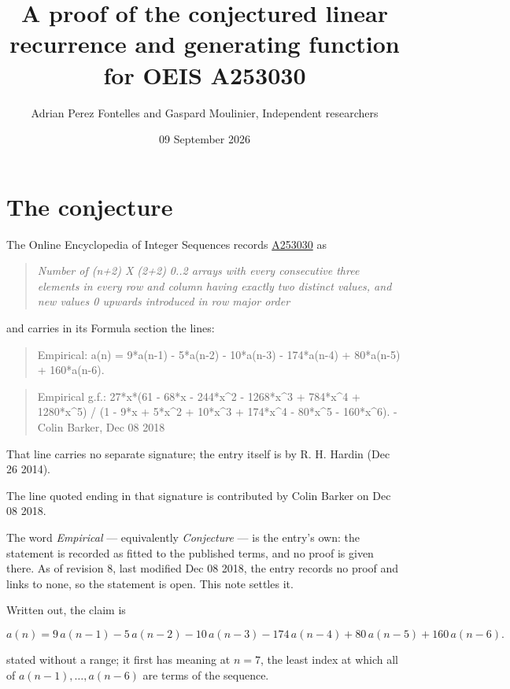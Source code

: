 \documentclass[11pt]{article}
\title{A proof of the conjectured linear recurrence and generating function for OEIS A253030}
\author{Adrian Perez Fontelles and Gaspard Moulinier, Independent researchers}
\date{09 September 2026}
\theoremstyle{definition}
\begin{document}
\maketitle
\section{The conjecture}

The Online Encyclopedia of Integer Sequences records \href{https://oeis.org/A253030}{A253030} as

\begin{quote}\itshape Number of (n+2) X (2+2) 0..2 arrays with every consecutive three elements in every row and column having exactly two distinct values, and new values 0 upwards introduced in row major order\end{quote}

and carries in its Formula section the lines:

\begin{quote}\ttfamily Empirical: a(n) = 9*a(n-1) - 5*a(n-2) - 10*a(n-3) - 174*a(n-4) + 80*a(n-5) + 160*a(n-6).\end{quote}

\begin{quote}\ttfamily Empirical g.f.: 27*x*(61 - 68*x - 244*x\textasciicircum{}2 - 1268*x\textasciicircum{}3 + 784*x\textasciicircum{}4 + 1280*x\textasciicircum{}5) / (1 - 9*x + 5*x\textasciicircum{}2 + 10*x\textasciicircum{}3 + 174*x\textasciicircum{}4 - 80*x\textasciicircum{}5 - 160*x\textasciicircum{}6). - Colin Barker, Dec 08 2018\end{quote}

That line carries no separate signature; the entry itself is by R. H. Hardin (Dec 26 2014).

The line quoted ending in that signature is contributed by Colin Barker on Dec 08 2018.

The word {\itshape Empirical} --- equivalently {\itshape Conjecture} --- is the entry's own: the statement is recorded as fitted to the published terms, and no proof is given there. As of revision 8, last modified Dec 08 2018, the entry records no proof and links to none, so the statement is open. This note settles it.

Written out, the claim is

\[a(n) = 9\,a(n-1) - 5\,a(n-2) - 10\,a(n-3) - 174\,a(n-4) + 80\,a(n-5) + 160\,a(n-6).\]

stated without a range; it first has meaning at $n = 7$, the least index at which all of $a(n-1),\dots,a(n-6)$ are terms of the sequence.
\end{document}
